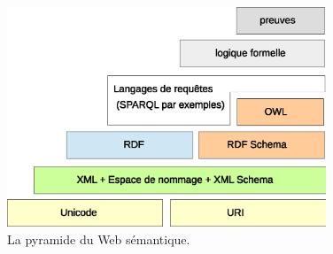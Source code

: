 \begin{figure}[h]
    \centering
    \includegraphics[width=0.85\textwidth]{figs/A/semantic-web-stack.eps}
    \caption{La pyramide du Web sémantique.}\label{fig:semantic-web-stack}
\end{figure}
